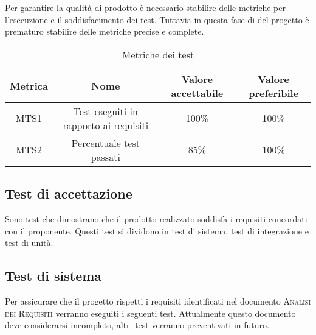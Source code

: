 \documentclass[../piano_di_qualifica.tex]{subfiles}
\begin{document}
Per garantire la qualità di prodotto è necessario stabilire delle metriche per l’esecuzione e il soddisfacimento dei test. Tuttavia in questa fase di del progetto è prematuro stabilire delle metriche precise e complete.


\begin{table}[!ht]
	\centering
	\begin{tabular}{|c|c|c|c|}
		\hline
		\rowcolor{lightgray}
		\textbf{Metrica} & \textbf{Nome}                          & \textbf{Valore accettabile} & \textbf{Valore preferibile} \\
		\hline
		MTS1             & Test eseguiti in rapporto ai requisiti & 100\%                       & 100\%                       \\
		MTS2             & Percentuale test passati               & 85\%                        & 100\%                       \\
		\hline
	\end{tabular}
	\caption{Metriche dei test}
\end{table}

\subsection{Test di accettazione}%
\label{sub:test_accett}
Sono test che dimostrano che il prodotto realizzato soddisfa i requisiti concordati con il proponente.
Questi test si dividono in test di sistema, test di integrazione e test di unità.

\subsection{Test di sistema}%
\label{sub:test_sist}
Per assicurare che il progetto rispetti i requisiti identificati nel documento \textsc{Analisi dei Requisiti} verranno eseguiti i seguenti test. Attualmente questo documento deve considerarsi incompleto, altri test verranno preventivati in futuro.
\end{document}
